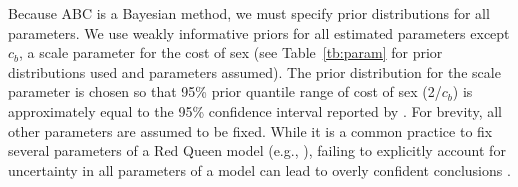 \documentclass{article}\usepackage[]{graphicx}\usepackage[]{color}
\begin{document}
Because ABC is a Bayesian method, we must specify prior distributions for all parameters.
We use weakly informative priors for all estimated parameters except $c_b$, a scale parameter for the cost of sex (see Table~\ref{tb:param} for prior distributions used and parameters assumed).
The prior distribution for the scale parameter is chosen so that 95\% prior quantile range of cost of sex (2/$c_b$) is approximately equal to the 95\% confidence interval reported by \cite{gibson2017two}.
For brevity, all other parameters are assumed to be fixed.
While it is a common practice to fix several parameters of a Red Queen model (e.g., \cite{lively2010epidemiological, ashby2015diversity, haafke2016eco, ashby2019understanding}), failing to explicitly account for uncertainty in all parameters of a model can lead to overly confident conclusions \citep{elderd2006uncertainty}.
\end{document}
